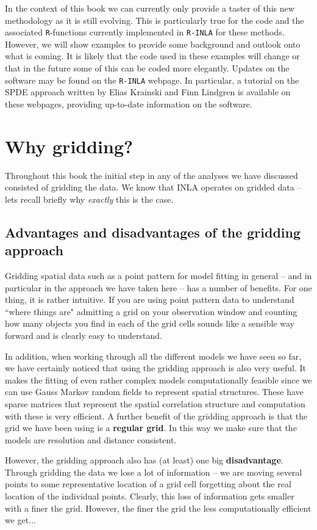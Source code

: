In the context of this book we can currently only provide a taster of this new methodology as it is still evolving. This is particularly true for the code and the associated \texttt{R}-functions currently implemented in \texttt{R-INLA} for these methods. However, we will show examples to provide some background and outlook onto what is coming.  It is likely that the code used in these examples will change or that in the future some of this can be coded more elegantly. Updates on the software may be found on the \texttt{R-INLA} webpage.  In particular, a tutorial on the SPDE approach written by Elias Krainski and Finn Lindgren is available on these webpages, providing up-to-date information on the software.

\section{ Why gridding?}
Throughout this book the initial step in any of the analyses we have discussed consisted of gridding the data. We know that INLA operates on gridded data -- lets recall briefly why \textit{exactly}  this is the case. 
\subsection{Advantages and disadvantages of the gridding approach}
Gridding spatial data such as a point pattern for model fitting in general -- and in particular in the approach we have taken here -- has a number of benefits.  For one thing, it is rather intuitive. If you are using point pattern data to understand ``where things are" admitting a grid on your observation window  and counting how many objects you find in each of the grid cells sounds like a sensible way forward and  is clearly easy to understand.  
   
In addition, when working through all the different models we have seen so far, we have certainly noticed that using the gridding approach is also very useful.  It makes the fitting of even rather complex models computationally feasible since we can use Gauss Markov random fields to represent spatial structures. These have sparse matrices that  represent the spatial correlation structure and computation with these is very  efficient.
A further benefit of the gridding approach is that the grid we have been using is a \textbf{regular grid}. In this way we make sure that the models are resolution and distance consistent. 

However, the gridding approach also has (at least) one big \textbf{disadvantage}. Through gridding the data
we lose a lot of information -- we are moving several points to some representative location of a grid cell forgetting about the real location of the individual points. 
Clearly, this loss of information gets smaller with a finer the grid. However, the finer the grid the less computationally efficient we get... 

